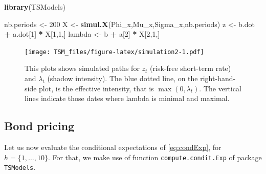 \documentclass[
  12pt,
]{book}
\newenvironment{Shaded}{\begin{snugshade}}{\end{snugshade}}
\newcommand{\AttributeTok}[1]{\textcolor[rgb]{0.13,0.29,0.53}{#1}}
\newcommand{\CommentTok}[1]{\textcolor[rgb]{0.56,0.35,0.01}{\textit{#1}}}
\newcommand{\DecValTok}[1]{\textcolor[rgb]{0.00,0.00,0.81}{#1}}
\newcommand{\FunctionTok}[1]{\textcolor[rgb]{0.13,0.29,0.53}{\textbf{#1}}}
\newcommand{\NormalTok}[1]{#1}
\newcommand{\OtherTok}[1]{\textcolor[rgb]{0.56,0.35,0.01}{#1}}
\newcommand{\SpecialCharTok}[1]{\textcolor[rgb]{0.81,0.36,0.00}{\textbf{#1}}}
\theoremstyle{definition}
\theoremstyle{definition}
\theoremstyle{definition}
\theoremstyle{definition}
\theoremstyle{remark}
\begin{document}
\begin{Shaded}
\begin{Highlighting}[]
\FunctionTok{library}\NormalTok{(TSModels)}

\NormalTok{nb.periods }\OtherTok{\textless{}{-}} \DecValTok{200}
\NormalTok{X }\OtherTok{\textless{}{-}} \FunctionTok{simul.X}\NormalTok{(Phi\_x,Mu\_x,Sigma\_x,nb.periods)}
\NormalTok{z }\OtherTok{\textless{}{-}}\NormalTok{ b.dot }\SpecialCharTok{+}\NormalTok{ a.dot[}\DecValTok{1}\NormalTok{] }\SpecialCharTok{*}\NormalTok{ X[}\DecValTok{1}\NormalTok{,}\DecValTok{1}\NormalTok{,]}
\NormalTok{lambda }\OtherTok{\textless{}{-}}\NormalTok{ b }\SpecialCharTok{+}\NormalTok{ a[}\DecValTok{2}\NormalTok{] }\SpecialCharTok{*}\NormalTok{ X[}\DecValTok{2}\NormalTok{,}\DecValTok{1}\NormalTok{,]}
\end{Highlighting}
\end{Shaded}

\begin{figure}
\centering
\texttt{[image: TSM\_files/figure-latex/simulation2-1.pdf]}
\caption{\label{fig:simulation2}This plots shows simulated paths for \(z_t\) (risk-free short-term rate) and \(\lambda_t\) (shadow intensity). The blue dotted line, on the right-hand-side plot, is the effective intensity, that is \(\max(0,\lambda_t)\). The vertical lines indicate those dates where lambda is minimal and maximal.}
\end{figure}

\hypertarget{sec:Model}{%
\subsection{Bond pricing}\label{sec:Model}}

Let us now evaluate the conditional expectations of \eqref{eq:condExp}, for \(h=\{1,\dots,10\}\). For that, we make use of function \texttt{compute.condit.Exp} of package \texttt{TSModels}.

\begin{Shaded}
\end{Shaded}
\end{document}
